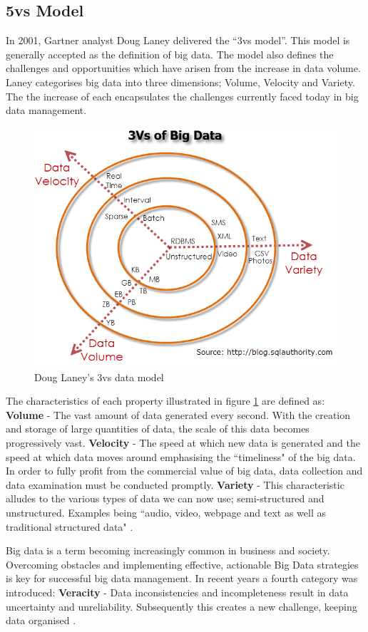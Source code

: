 \subsection{5vs Model}\label{5vs}
In 2001, Gartner analyst Doug Laney delivered the ``3vs model''. This model is generally accepted as the definition of big data. The model also defines the challenges and opportunities which have arisen from the increase in data volume. Laney categorises big data into three dimensions; Volume, Velocity and Variety. The the increase of each encapsulates the challenges currently faced today in big data management. \begin{figure}[h]\begin{center}\includegraphics[width=0.8\linewidth]{images/3vs}\caption{Doug Laney's 3vs data model}\label{fig:3vs}\end{center}\end{figure}
\parindent 0pt
The characteristics of each property illustrated in figure \ref{fig:3vs} are defined as: \textbf{Volume} - The vast amount of data generated every second. With the creation and storage of large quantities of data, the scale of this data becomes progressively vast. \textbf{Velocity} -  The speed at which new data is generated and the speed at which data moves around emphasising the ``timeliness" of the big data. In order to fully profit from the commercial value of big data, data collection and data examination must be conducted promptly. \textbf{Variety} - This characteristic alludes to the various types of data we can now use; semi-structured and unstructured. Examples being ``audio, video, webpage and text as well as traditional structured data" \cite{bigdata}.

\parindent 15pt
Big data is a term becoming increasingly common in business and society. Overcoming obstacles and implementing effective, actionable Big Data strategies is key for successful big data management. In recent years a fourth category was introduced: \textbf{Veracity} - Data inconsistencies and incompleteness result in data uncertainty and unreliability. Subsequently this creates a new challenge, keeping data organised \cite{bigdata}.

